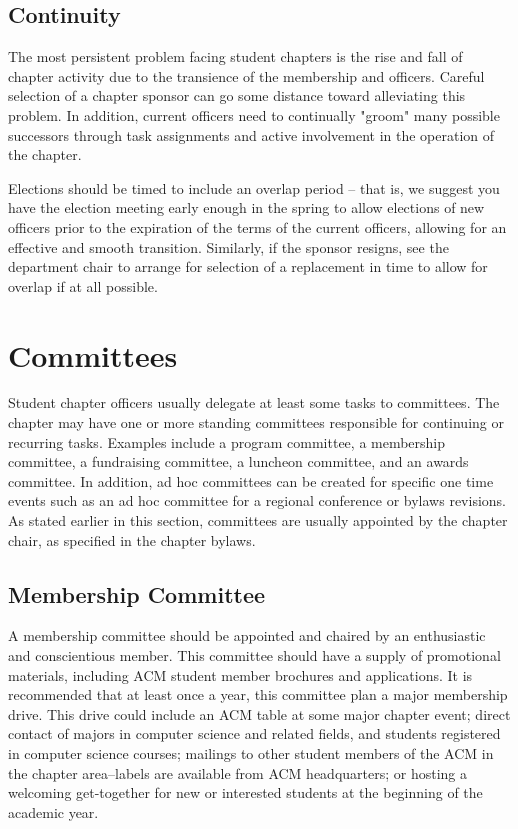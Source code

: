 \subsection*{Continuity}
The most persistent problem facing student chapters is the rise and fall of chapter activity due to the transience of the membership and officers. Careful selection of a chapter sponsor can go some distance toward alleviating this problem. In addition, current officers need to continually "groom" many possible successors through task assignments and active involvement in the operation of the chapter.

Elections should be timed to include an overlap period -- that is, we suggest you have the election meeting early enough in the spring to allow elections of new officers prior to the expiration of the terms of the current officers, allowing for an effective and smooth transition. Similarly, if the sponsor resigns, see the department chair to arrange for selection of a replacement in time to allow for overlap if at all possible.

\section{Committees}
\label{sec:committees}

Student chapter officers usually delegate at least some tasks to committees. The chapter may have one or more standing committees responsible for continuing or recurring tasks. Examples include a program committee, a membership committee, a fundraising committee, a luncheon committee, and an awards committee. In addition, ad hoc committees can be created for specific one time events such as an ad hoc committee for a regional conference or bylaws revisions. As stated earlier in this section, committees are usually appointed by the chapter chair, as specified in the chapter bylaws.

\subsection*{Membership Committee}
A membership committee should be appointed and chaired by an enthusiastic and conscientious member. This committee should have a supply of promotional materials, including ACM student member brochures and applications. It is recommended that at least once a year, this committee plan a major membership drive. This drive could include an ACM table at some major chapter event; direct contact of majors in computer science and related fields, and students registered in computer science courses; mailings to other student members of the ACM in the chapter area--labels are available from ACM headquarters; or hosting a welcoming get-together for new or interested students at the beginning of the academic year.
